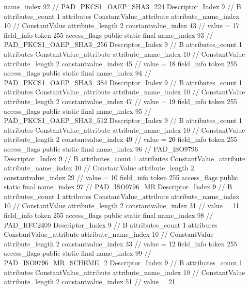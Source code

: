 {{{{{				name_index	92		// PAD_PKCS1_OAEP_SHA3_224
				Descriptor_Index	9		// B
				attributes_count	1
				attributes {
				ConstantValue_attribute {
					attribute_name_index	10		// ConstantValue
					attribute_length	2
					constantvalue_index	43		// value = 17
				}
				}
			}
			field_info {
				token	255
				access_flags	public static final
				name_index	93		// PAD_PKCS1_OAEP_SHA3_256
				Descriptor_Index	9		// B
				attributes_count	1
				attributes {
				ConstantValue_attribute {
					attribute_name_index	10		// ConstantValue
					attribute_length	2
					constantvalue_index	45		// value = 18
				}
				}
			}
			field_info {
				token	255
				access_flags	public static final
				name_index	94		// PAD_PKCS1_OAEP_SHA3_384
				Descriptor_Index	9		// B
				attributes_count	1
				attributes {
				ConstantValue_attribute {
					attribute_name_index	10		// ConstantValue
					attribute_length	2
					constantvalue_index	47		// value = 19
				}
				}
			}
			field_info {
				token	255
				access_flags	public static final
				name_index	95		// PAD_PKCS1_OAEP_SHA3_512
				Descriptor_Index	9		// B
				attributes_count	1
				attributes {
				ConstantValue_attribute {
					attribute_name_index	10		// ConstantValue
					attribute_length	2
					constantvalue_index	49		// value = 20
				}
				}
			}
			field_info {
				token	255
				access_flags	public static final
				name_index	96		// PAD_ISO9796
				Descriptor_Index	9		// B
				attributes_count	1
				attributes {
				ConstantValue_attribute {
					attribute_name_index	10		// ConstantValue
					attribute_length	2
					constantvalue_index	29		// value = 10
				}
				}
			}
			field_info {
				token	255
				access_flags	public static final
				name_index	97		// PAD_ISO9796_MR
				Descriptor_Index	9		// B
				attributes_count	1
				attributes {
				ConstantValue_attribute {
					attribute_name_index	10		// ConstantValue
					attribute_length	2
					constantvalue_index	31		// value = 11
				}
				}
			}
			field_info {
				token	255
				access_flags	public static final
				name_index	98		// PAD_RFC2409
				Descriptor_Index	9		// B
				attributes_count	1
				attributes {
				ConstantValue_attribute {
					attribute_name_index	10		// ConstantValue
					attribute_length	2
					constantvalue_index	33		// value = 12
				}
				}
			}
			field_info {
				token	255
				access_flags	public static final
				name_index	99		// PAD_ISO9796_MR_SCHEME_2
				Descriptor_Index	9		// B
				attributes_count	1
				attributes {
				ConstantValue_attribute {
					attribute_name_index	10		// ConstantValue
					attribute_length	2
					constantvalue_index	51		// value = 21
}}}}}}}

